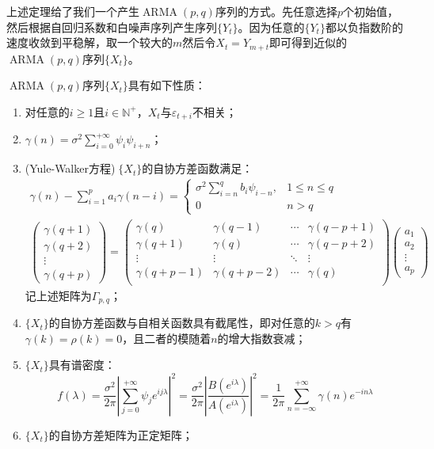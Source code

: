 \begin{note}
	上述定理给了我们一个产生$\operatorname{ARMA}(p,q)$序列的方式。先任意选择$p$个初始值，然后根据自回归系数和白噪声序列产生序列$\{Y_t\}$。因为任意的$\{Y_t\}$都以负指数阶的速度收敛到平稳解，取一个较大的$m$然后令$X_t=Y_{m+t}$即可得到近似的$\operatorname{ARMA}(p,q)$序列$\{X_t\}$。
\end{note}
\begin{property}
	$\operatorname{ARMA}(p,q)$序列$\{X_t\}$具有如下性质：
	\begin{enumerate}
		\item 对任意的$i\geqslant1$且$i\in\mathbb{N}^+$，$X_t$与$\varepsilon_{t+i}$不相关；
		\item $\gamma(n)=\sigma^2\sum\limits_{i=0}^{+\infty}\psi_i\psi_{i+n}$；
		\item (Yule-Walker方程)$\;\{X_t\}$的自协方差函数满足：
		\begin{gather*}
			\gamma(n)-\sum_{i=1}^{p}a_i\gamma(n-i)=
			\begin{cases}
				\sigma^2\sum\limits_{i=n}^{q}b_i\psi_{i-n},&1\leqslant n\leqslant q \\
				0 & n>q
			\end{cases} \\
			\begin{pmatrix}
				\gamma(q+1) \\
				\gamma(q+2) \\
				\vdots \\
				\gamma(q+p)
			\end{pmatrix}=
			\begin{pmatrix}
				\gamma(q) & \gamma(q-1) & \cdots & \gamma(q-p+1) \\
				\gamma(q+1) & \gamma(q) & \cdots & \gamma(q-p+2) \\
				\vdots & \vdots & \ddots & \vdots \\
				\gamma(q+p-1) & \gamma(q+p-2) & \cdots & \gamma(q) \\
			\end{pmatrix}
			\begin{pmatrix}
				a_1 \\
				a_2 \\
				\vdots \\
				a_p
			\end{pmatrix}
		\end{gather*}
		记上述矩阵为$\Gamma_{p,q}$；
		\item $\{X_t\}$的自协方差函数与自相关函数具有截尾性，即对任意的$k>q$有$\gamma(k)=\rho(k)=0$，且二者的模随着$n$的增大指数衰减；
		\item $\{X_t\}$具有谱密度：
		\begin{equation*}
			f(\lambda)=\frac{\sigma^2}{2\pi}\left|\sum_{j=0}^{+\infty}\psi_je^{ij\lambda}\right|^2=\frac{\sigma^2}{2\pi}\left|\frac{B(e^{i\lambda})}{A(e^{i\lambda})}\right|^2=\frac{1}{2\pi}\sum_{n=-\infty}^{+\infty}\gamma(n)e^{-in\lambda}
		\end{equation*}
		\item $\{X_t\}$的自协方差矩阵为正定矩阵；
	\end{enumerate}
\end{property}
